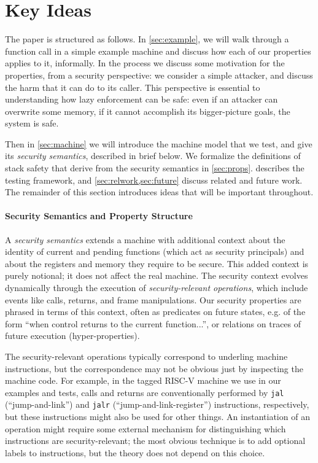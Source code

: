 \documentclass[10pt,conference]{ieeetran}%
\theoremstyle{definition}
\begin{document}
\section{Key Ideas}
\label{sec:ideas}

The paper is structured as follows. In \cref{sec:example}, we will walk through a function
call in a simple example machine and discuss how each of our properties applies to it,
informally. In the process we discuss some motivation for the properties, from a security
perspective: we consider a simple attacker, and discuss the harm that it can do to
its caller. This perspective is essential to understanding how lazy enforcement can
be safe: even if an attacker can overwrite some memory, if it cannot accomplish
its bigger-picture goals, the system is safe.

Then in \cref{sec:machine} we will introduce the machine model that we test, and give
its {\em security semantics}, described in brief below. We formalize the definitions of
stack safety that derive from the security semantics in \cref{sec:props}.
 describes the testing framework, and
\cref{sec:relwork,sec:future} discuss related and future work.
The remainder of this section introduces ideas that will be important throughout.

\paragraph*{Security Semantics and Property Structure}

A {\it security semantics} extends a machine
with additional context about the identity of current and pending
functions (which act as security principals) and about the registers and memory they require
to be secure. This added context is purely notional;
it does not affect the real machine. The security context
evolves dynamically through the execution of {\it security-relevant operations},
which include events like calls, returns, and frame manipulations.
Our security properties are phrased in terms of this context, often as predicates
on future states, e.g. of the form ``when control returns to the current function...'',
or relations on traces of future execution (hyper-properties).

The security-relevant operations typically correspond to underling machine instructions,
but the correspondence may not be obvious just by inspecting the machine code.
For example, in the tagged RISC-V machine we use in our examples and tests,
calls and returns are conventionally performed by {\tt jal} (``jump-and-link'')
and {\tt jalr} (``jump-and-link-register'') instructions, respectively, but these
instructions might also be used for other things. An instantiation of an operation
might require some external mechanism for distinguishing which instructions are
security-relevant; the most obvious technique is to add optional labels to instructions,
but the theory does not depend on this choice.
\end{document}
